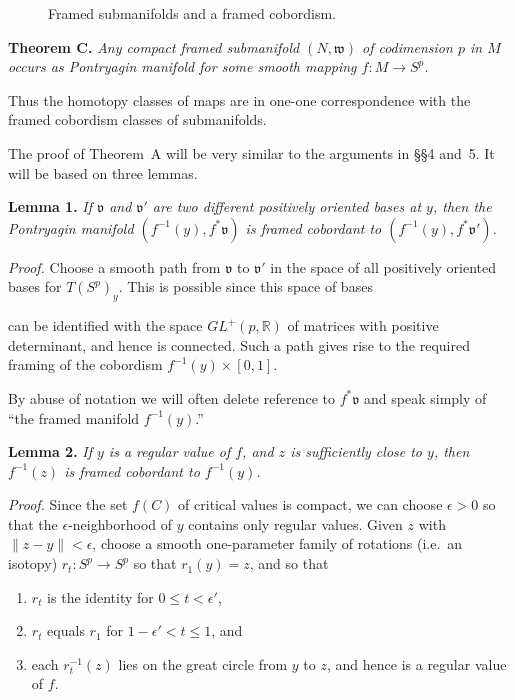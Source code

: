 

\begin{figure}[htbp]
\centering
\setcounter{figure}{15}%
\caption{Framed submanifolds and a framed cobordism.}\label{fig:milnor-16}
\end{figure}

\noindent\textbf{Theorem C.} \textit{Any compact framed submanifold $(N, \mathfrak{w})$ of codimension $p$ in $M$ occurs as Pontryagin manifold for some smooth mapping $f : M \to S^p$.}

Thus the homotopy classes of maps are in one-one correspondence with the framed cobordism classes of submanifolds.

The proof of Theorem~A will be very similar to the arguments in \S\S4 and~5. It will be based on three lemmas.

\noindent\textbf{Lemma 1.} \textit{If $\mathfrak{v}$ and $\mathfrak{v}'$ are two different positively oriented bases at $y$, then the Pontryagin manifold $(f^{-1}(y), f^*\mathfrak{v})$ is framed cobordant to $(f^{-1}(y), f^*\mathfrak{v}')$.}

\noindent\textit{Proof.}
Choose a smooth path from $\mathfrak{v}$ to $\mathfrak{v}'$ in the space of all positively oriented bases for $T(S^p)_y$. This is possible since this space of bases



can be identified with the space $GL^+(p, \mathbb{R})$ of matrices with positive determinant, and hence is connected. Such a path gives rise to the required framing of the cobordism $f^{-1}(y) \times [0, 1]$.

By abuse of notation we will often delete reference to $f^*\mathfrak{v}$ and speak simply of ``the framed manifold $f^{-1}(y)$.''

\noindent\textbf{Lemma 2.} \textit{If $y$ is a regular value of $f$, and $z$ is sufficiently close to $y$, then $f^{-1}(z)$ is framed cobordant to $f^{-1}(y)$.}

\noindent\textit{Proof.}
Since the set $f(C)$ of critical values is compact, we can choose $\epsilon > 0$ so that the $\epsilon$-neighborhood of $y$ contains only regular values. Given $z$ with $\|z - y\| < \epsilon$, choose a smooth one-parameter family of rotations (i.e.\ an isotopy) $r_t : S^p \to S^p$ so that $r_1(y) = z$, and so that
\begin{enumerate}
\item $r_t$ is the identity for $0 \le t < \epsilon'$,
\item $r_t$ equals $r_1$ for $1 - \epsilon' < t \le 1$, and
\item each $r_t^{-1}(z)$ lies on the great circle from $y$ to $z$, and hence is a regular value of $f$.
\end{enumerate}

